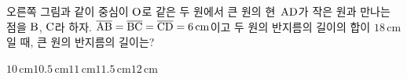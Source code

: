 \noindent\begin{minipage}[t]{0.58\linewidth}\vspace{0pt}\raggedright 오른쪽 그림과 같이 중심이 $\mathrm{O}$로 같은 두 원에서 큰 원의 현~$\mathrm{AD}$가 작은 원과 만나는 점을 $\mathrm{B}$, $\mathrm{C}$라 하자. $\overline{\mathrm{AB}}=\overline{\mathrm{BC}}=\overline{\mathrm{CD}}=6\,\mathrm{cm}$이고 두 원의 반지름의 길이의 합이 $18\,\mathrm{cm}$일 때, 큰 원의 반지름의 길이는?\end{minipage}\hfill\begin{minipage}[t]{0.4\linewidth}\vspace{0pt}\centering \resizebox{\ifdim\width>\linewidth\linewidth\else\width\fi}{!}{}\end{minipage}\par
\begin{choices32}{$10\,\mathrm{cm}$}{$10.5\,\mathrm{cm}$}{$11\,\mathrm{cm}$}{$11.5\,\mathrm{cm}$}{$12\,\mathrm{cm}$}\end{choices32}
